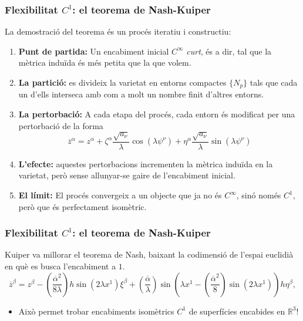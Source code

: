 \documentclass[aspectratio=169]{beamer}
\begin{document}
\begin{frame}
  \frametitle{Flexibilitat $C^1$: el teorema de Nash-Kuiper}
  
  La demostració del teorema és un procés iteratiu i constructiu: 
  
  \begin{enumerate}
    \item<1-> \textbf{Punt de partida:} Un encabiment inicial $C^\infty$ \emph{curt}, és a dir, tal que la mètrica induïda és més petita que la que volem. 
    \pause
    \item<2-> \textbf{La partició:} es divideix la varietat en entorns compactes $\{ N_p \}$ tals que cada un d'ells interseca amb com a molt un nombre finit d'altres entorns.
    \pause
    \item<3-> \textbf{La pertorbació:} A cada etapa del procés, cada entorn és modificat per una pertorbació de la forma
    \begin{equation*}
        \boxed{\overline{z}^\alpha = z^\alpha + \zeta^\alpha\frac{\sqrt{a_\nu}}{\lambda}\cos(\lambda \psi^\nu) + \eta^\alpha\frac{\sqrt{a_\nu}}{\lambda}\sin(\lambda \psi^\nu)}
    \end{equation*}
    \pause
    \item<4-> \textbf{L'efecte:} aquestes pertorbacions incrementen la mètrica induïda en la varietat, però sense allunyar-se gaire de l'encabiment inicial.
    \pause
    \item<5-> \textbf{El límit:} El procés convergeix a un objecte que ja no és $C^\infty$, sinó només $C^1$, però que és perfectament isomètric. 
  \end{enumerate}
\end{frame}

\begin{frame}
    \frametitle{Flexibilitat $C^1$: el teorema de Nash-Kuiper}
    
    Kuiper va millorar el teorema de Nash, baixant la codimensió de l'espai euclidià en què es busca l'encabiment a $1$.
    \begin{equation*}
        \boxed{
            \overline{z}^\beta = z^\beta - \left(\frac{\overline \alpha^2}{8\lambda}\right)h\sin\left(2\lambda x^1\right)\xi^\beta + \left(\frac{\overline\alpha}{\lambda}\right)\sin\left(\lambda x^1 - \left(\frac{\overline\alpha ^2}{8}\right)\sin\left(2\lambda x^1\right)\right)h\eta^\beta,
            }
    \end{equation*}
    \begin{itemize}
      \item<1-> Això permet trobar encabiments isomètrics $C^1$ de superfícies encabides en $\mathbb R^3$!
    \end{itemize}
  \end{frame}
\end{document}
